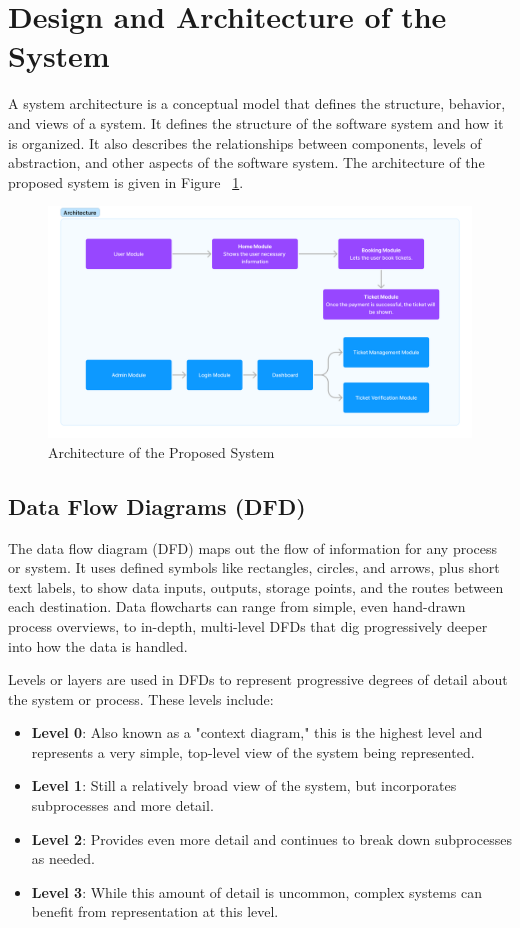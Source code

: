\documentclass[12pt,a4paper]{report}
\begin{document}
\section{Design and Architecture of the System}
A system architecture is a conceptual model that defines the structure, behavior, and views of a system. It defines the structure of the software system and how it is organized. It also describes the relationships between components, levels of abstraction, and other aspects of the software system. The architecture of the proposed system is given in Figure ~\ref{architecture}.
\begin{figure}[ht]
    \centering
    \includegraphics[width=\textwidth]{assets/Architecture.png}
    \caption{Architecture of the Proposed System}
    \label{architecture}
\end{figure}

\subsection{Data Flow Diagrams (DFD)}
The data flow diagram (DFD) maps out the flow of information for any process or system. It uses defined symbols like rectangles, circles, and arrows, plus short text labels, to show data inputs, outputs, storage points, and the routes between each destination. Data flowcharts can range from simple, even hand-drawn process overviews, to in-depth, multi-level DFDs that dig progressively deeper into how the data is handled.

Levels or layers are used in DFDs to represent progressive degrees of detail about the system or process. These levels include:
\begin{itemize}
    \item \textbf{Level 0}: Also known as a "context diagram," this is the highest level and represents a very simple, top-level view of the system being represented.
    \item \textbf{Level 1}: Still a relatively broad view of the system, but incorporates subprocesses and more detail.
    \item \textbf{Level 2}: Provides even more detail and continues to break down subprocesses as needed.
    \item \textbf{Level 3}: While this amount of detail is uncommon, complex systems can benefit from representation at this level.
\end{itemize}
\end{document}
